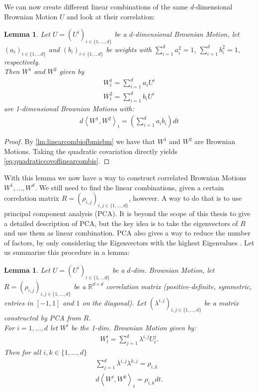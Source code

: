 \documentclass[12pt]{article}
\newtheorem{lemma}[theorem]{Lemma}
\begin{document}
	We can now create different linear combinations of the same $d$-dimensional Brownian Motion $U$ and look at their correlation:
	\begin{lemma}
		Let $U = (U^i)_{i\in\{1, ..., d\}}$ be a $d$-dimensional Brownian Motion, let $(a_i)_{i\in\{1,...d\}}$ and $(b_i)_{i\in\{1,...d\}}$ be weights with $\sum_{i=1}^{d}a^2_i = 1$, $\sum_{i=1}^{d}b^2_i = 1$, respectively.\\
		Then $W^1$ and $W^2$ given by 
		\begin{align*}
			W^1_t = \sum_{i=1}^{d}a_iU^i\\
			W^2_t = \sum_{i=1}^{d}b_iU^i
		\end{align*}
		are 1-dimensional Brownian Motions with:
		\begin{align}\label{eq:quadraticcovoflinearcombis}
			d\left\langle W^{1}, W^{2} \right\rangle_t = \left(\sum_{i=1}^{d}a_ib_i \right)dt
		\end{align}
	\end{lemma}
	\begin{proof}
		By \cref{lm:linearcombiofbmisbm} we have that $W^1$ and $W^2$ are Brownian Motions. Taking the quadratic covariation directly yields \cref{eq:quadraticcovoflinearcombis}.
	\end{proof}
	With this lemma we now have a way to construct correlated Brownian Motions $W^1, ..., W^d$. We still need to find the linear combinations, given a certain correlation matrix $R = (\rho_{i,j})_{i,j\in\{1,...,d\}}$, however. A way to do that is to use principal component analysis (PCA). It is beyond the scope of this thesis to give a detailed description of PCA, but the key idea is to take the eigenvectors of $R$ and use them as linear combination. PCA also gives a way to reduce the number of factors, by only considering the Eigenvectors with the highest Eigenvalues \cite{FriesBook}. Let us summarize this procedure in a lemma:
	\begin{lemma}
		Let $U=(U^i)_{i\in\{1, ... d\}}$ be a $d$-dim. Brownian Motion, let $R=(\rho_{i,j})_{i,j\in\{1,...,d\}}$ be a $\mathbb{R}^{d\times d}$ correlation matrix (positive-definite, symmetric, entries in $\left[-1,1\right]$ and $1$ on the diagonal). Let $(\lambda^{i,j})_{i,j\in\{1,...,d\}}$ be a matrix constructed by PCA from $R$.\\
		For $i=1,..., d$ let $W^i$ be the 1-dim. Brownian Motion given by:
		\begin{align*}
			W^i_t = \sum_{j=1}^{d}\lambda^{i,j}U^j_t.
		\end{align*}
		Then for all $i, k \in \{1, ..., d\}$ 
		\begin{align*}
			\sum_{j=1}^{d}\lambda^{i,j}\lambda^{k,j} = \rho_{i,k}\\
			d\left\langle W^{i}, W^{k} \right\rangle_t = \rho_{i,k}dt.
		\end{align*}
	\end{lemma}
\end{document}
